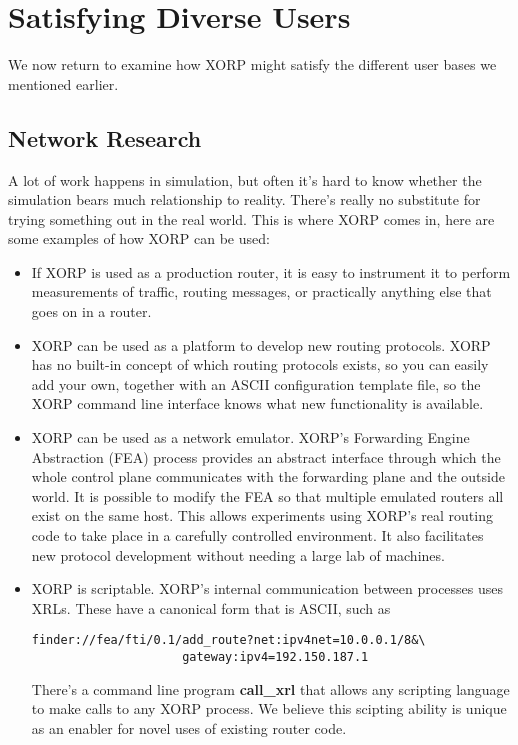 \section{Satisfying Diverse Users}

We now return to examine how XORP might satisfy the different user
bases we mentioned earlier.

\subsection{Network Research}

A lot of work happens in simulation,
but often it's hard to know whether the simulation bears much
relationship to reality.  There's really no substitute for trying
something out in the real world.  This is where XORP comes in, here are some examples of how XORP can be used:
\vspace{-0.07in}
\begin{itemize}
\item If XORP is used as a production router, it is easy to instrument
it to perform measurements of traffic, routing messages, or
practically anything else that goes on in a router.  
\vspace{-0.07in}
\item XORP can be used as a platform to develop new routing protocols.
XORP has no built-in concept of which routing protocols exists, so you
can easily add your own, together with an ASCII configuration template
file, so the XORP command line interface knows what new
functionality is available.
\vspace{-0.07in}
\item XORP can be used as a network emulator.
XORP's Forwarding Engine Abstraction (FEA) process provides an
abstract interface through which the whole control plane communicates
with the forwarding plane and the outside world.  It is possible to
modify the FEA so that multiple emulated routers all exist on the same
host.  This allows experiments using XORP's real routing code to take
place in a carefully controlled environment.  It also facilitates new
protocol development without needing a large lab of machines.
\vspace{-0.07in}
\item XORP is scriptable.  XORP's internal communication between
processes uses XRLs.
These have a canonical form that is ASCII, such as 
\vspace{-0.1in}
\begin{verbatim}
finder://fea/fti/0.1/add_route?net:ipv4net=10.0.0.1/8&\
                     gateway:ipv4=192.150.187.1
\end{verbatim}
\vspace{-0.1in} There's a command line program \textbf{call\_xrl} that
allows any scripting language to make calls to any XORP process.  We
believe this scipting ability is unique as an enabler for novel uses of
existing router code.
\end{itemize}


